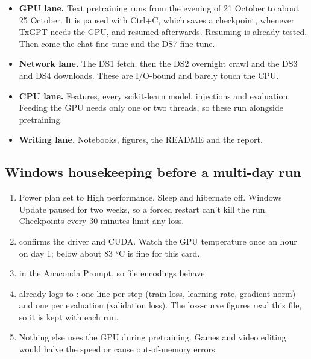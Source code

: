 \begin{itemize}
  \item \textbf{GPU lane.} Text pretraining runs from the evening of 21 October to about 25
    October. It is paused with Ctrl+C, which saves a checkpoint, whenever TxGPT needs the GPU, and
    resumed afterwards. Resuming is already tested. Then come the chat fine-tune and the DS7
    fine-tune.
  \item \textbf{Network lane.} The DS1 fetch, then the DS2 overnight crawl and the DS3 and DS4
    downloads. These are I/O-bound and barely touch the CPU.
  \item \textbf{CPU lane.} Features, every scikit-learn model, injections and evaluation. Feeding
    the GPU needs only one or two threads, so these run alongside pretraining.
  \item \textbf{Writing lane.} Notebooks, figures, the README and the report.
\end{itemize}

\subsection{Windows housekeeping before a multi-day run}

\begin{enumerate}
  \item Power plan set to High performance. Sleep and hibernate off. Windows Update paused for
    two weeks, so a forced restart can't kill the run. Checkpoints every 30 minutes limit any loss.
  \item {} confirms the driver and CUDA. Watch the GPU temperature once an hour
    on day 1; below about 83 °C is fine for this card.
  \item {} in the Anaconda Prompt, so file encodings behave.
  \item {} already logs to : one line per step (train
    loss, learning rate, gradient norm) and one per evaluation (validation loss). The loss-curve
    figures read this file, so it is kept with each run.
  \item Nothing else uses the GPU during pretraining. Games and video editing would halve the
    speed or cause out-of-memory errors.
\end{enumerate}
